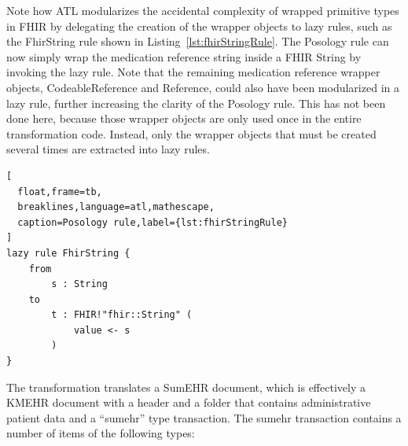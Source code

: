 \documentclass[
twocolumn,
]{ceurart}
\begin{document}
Note how ATL modularizes the accidental complexity of wrapped primitive types
in FHIR by delegating the creation of the wrapper objects to lazy rules, such
as the FhirString rule shown in Listing~\ref{lst:fhirStringRule}. The Posology rule
can now simply wrap the medication reference string inside a FHIR String by
invoking the lazy rule. Note that the remaining medication reference wrapper
objects, CodeableReference and Reference, could also have been modularized
in a lazy rule, further increasing the clarity of the Posology rule. This
has not been done here, because those wrapper objects are only used once
in the entire transformation code. Instead, only the wrapper objects that
must be created several times are extracted into lazy rules.

\begin{lstlisting}[
  float,frame=tb,
  breaklines,language=atl,mathescape,
  caption=Posology rule,label={lst:fhirStringRule}
]
lazy rule FhirString {
	from
		s : String
	to
		t : FHIR!"fhir::String" (
			value <- s
		)
}
\end{lstlisting}

The transformation translates a SumEHR document, which is effectively a KMEHR
document with a header and a folder that contains administrative patient
data and a ``sumehr'' type transaction. The sumehr transaction contains a
number of items of the following types:
\end{document}
